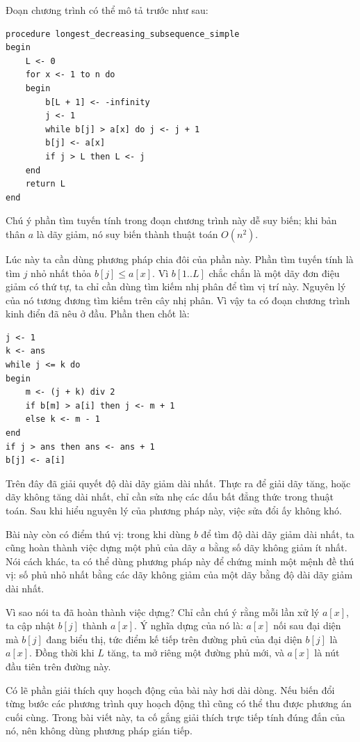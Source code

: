 \documentclass[11pt]{article}
\begin{document}
Đoạn chương trình có thể mô tả trước như sau:

\begin{verbatim}
procedure longest_decreasing_subsequence_simple
begin
    L <- 0
    for x <- 1 to n do
    begin
        b[L + 1] <- -infinity
        j <- 1
        while b[j] > a[x] do j <- j + 1
        b[j] <- a[x]
        if j > L then L <- j
    end
    return L
end
\end{verbatim}

Chú ý phần tìm tuyến tính trong đoạn chương trình này dễ suy biến; khi bản
thân \(a\) là dãy giảm, nó suy biến thành thuật toán \(O(n^2)\).

Lúc này ta cần dùng phương pháp chia đôi của phần này. Phần tìm tuyến tính là
tìm \(j\) nhỏ nhất thỏa \(b[j]\le a[x]\). Vì \(b[1..L]\) chắc chắn là một dãy
đơn điệu giảm có thứ tự, ta chỉ cần dùng tìm kiếm nhị phân để tìm vị trí này.
Nguyên lý của nó tương đương tìm kiếm trên cây nhị phân. Vì vậy ta có đoạn
chương trình kinh điển đã nêu ở đầu. Phần then chốt là:

\begin{verbatim}
j <- 1
k <- ans
while j <= k do
begin
    m <- (j + k) div 2
    if b[m] > a[i] then j <- m + 1
    else k <- m - 1
end
if j > ans then ans <- ans + 1
b[j] <- a[i]
\end{verbatim}

Trên đây đã giải quyết độ dài dãy giảm dài nhất. Thực ra để giải dãy tăng,
hoặc dãy không tăng dài nhất, chỉ cần sửa nhẹ các dấu bất đẳng thức trong
thuật toán. Sau khi hiểu nguyên lý của phương pháp này, việc sửa đổi ấy không
khó.

Bài này còn có điểm thú vị: trong khi dùng \(b\) để tìm độ dài dãy giảm dài
nhất, ta cũng hoàn thành việc dựng một phủ của dãy \(a\) bằng số dãy không
giảm ít nhất. Nói cách khác, ta có thể dùng phương pháp này để chứng minh một
mệnh đề thú vị: số phủ nhỏ nhất bằng các dãy không giảm của một dãy bằng độ
dài dãy giảm dài nhất.

Vì sao nói ta đã hoàn thành việc dựng? Chỉ cần chú ý rằng mỗi lần xử lý
\(a[x]\), ta cập nhật \(b[j]\) thành \(a[x]\). Ý nghĩa dựng của nó là: \(a[x]\)
nối sau đại diện mà \(b[j]\) đang biểu thị, tức điểm kế tiếp trên đường phủ
của đại diện \(b[j]\) là \(a[x]\). Đồng thời khi \(L\) tăng, ta mở riêng một
đường phủ mới, và \(a[x]\) là nút đầu tiên trên đường này.

Có lẽ phần giải thích quy hoạch động của bài này hơi dài dòng. Nếu biến đổi
từng bước các phương trình quy hoạch động thì cũng có thể thu được phương án
cuối cùng. Trong bài viết này, ta cố gắng giải thích trực tiếp tính đúng đắn
của nó, nên không dùng phương pháp gián tiếp.
\end{document}
